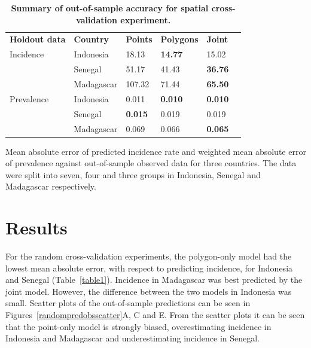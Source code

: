 \documentclass[10pt,letterpaper]{article}
\newlength\savedwidth
\newcommand\thickhline{\noalign{\global\savedwidth\arrayrulewidth\global\arrayrulewidth 2pt}%
\hline
\noalign{\global\arrayrulewidth\savedwidth}}
\begin{document}
\begin{table}[!t]
\begin{adjustwidth}{-2.25in}{0in} %
\centering
\caption{
{\bf Summary of out-of-sample accuracy for spatial cross-validation experiment.}}
\begin{tabular}{llllll}
\hline
{\bf Holdout data} & {\bf Country} &  {\bf Points} & {\bf Polygons} & {\bf Joint} \\
\thickhline 
Incidence & Indonesia &  18.13 &  {\bf 14.77} &   15.02\\
& Senegal &  51.17 &  41.43 &   {\bf 36.76}\\
& Madagascar & 107.32 &  71.44 &   {\bf 65.50}\vspace{3mm}\\
Prevalence & Indonesia & 0.011 & {\bf 0.010} &  {\bf 0.010}\\
& Senegal & {\bf 0.015} & 0.019 &  0.019\\
& Madagascar & 0.069 & 0.066 &  {\bf 0.065}\\
\end{tabular}
\begin{flushleft}
Mean absolute error of predicted incidence rate and weighted mean absolute error of prevalence against out-of-sample observed data for three countries.
The data were split into seven, four and three groups in Indonesia, Senegal and Madagascar respectively.
\end{flushleft}
\label{table2}
\end{adjustwidth}
\end{table}



\section*{Results}




For the random cross-validation experiments, the polygon-only model had the lowest mean absolute error, with respect to predicting incidence, for Indonesia and Senegal (Table~\ref{table1}).
Incidence in Madagascar was best predicted by the joint model.
However, the difference between the two models in Indonesia was small.
Scatter plots of the out-of-sample predictions can be seen in Figures~\ref{randompredobsscatter}A, C and E.
From the scatter plots it can be seen that the point-only model is strongly biased, overestimating incidence in Indonesia and Madagascar and underestimating incidence in Senegal.
\end{document}
